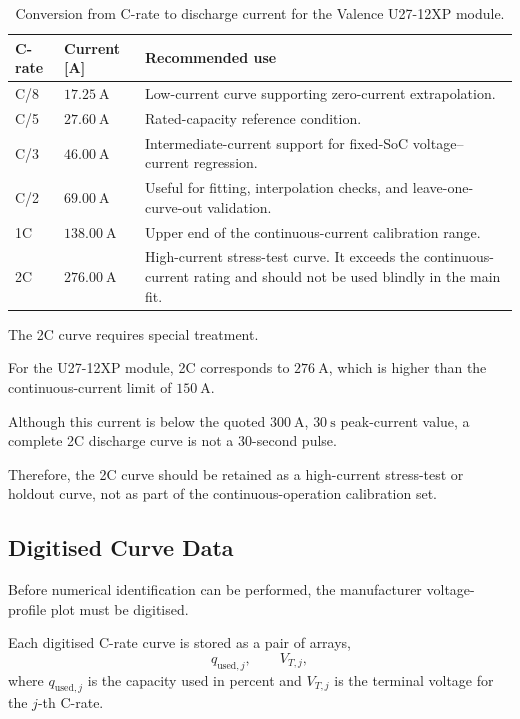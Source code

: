 \documentclass[a4paper,12pt]{article}
\begin{document}
\begin{table}[H]
\centering
\caption{Conversion from C-rate to discharge current for the Valence U27-12XP module.}
\label{tab:crate_currents}
\begin{tabularx}{0.99\textwidth}{@{}C{0.10\textwidth}C{0.20\textwidth}Y@{}}
\toprule
\textbf{C-rate} &
\textbf{Current [A]} &
\textbf{Recommended use} \\
\midrule
C/8 &
\(\SI{17.25}{\ampere}\) &
Low-current curve supporting zero-current extrapolation. \\
C/5 &
\(\SI{27.60}{\ampere}\) &
Rated-capacity reference condition. \\
C/3 &
\(\SI{46.00}{\ampere}\) &
Intermediate-current support for fixed-SoC voltage--current regression. \\
C/2 &
\(\SI{69.00}{\ampere}\) &
Useful for fitting, interpolation checks, and leave-one-curve-out validation. \\
1C &
\(\SI{138.00}{\ampere}\) &
Upper end of the continuous-current calibration range. \\
2C &
\(\SI{276.00}{\ampere}\) &
High-current stress-test curve.
It exceeds the continuous-current rating and should not be used blindly in the main fit. \\
\bottomrule
\end{tabularx}
\end{table}

The 2C curve requires special treatment.

For the U27-12XP module, 2C corresponds to \(\SI{276}{\ampere}\), which is higher than the continuous-current limit of \(\SI{150}{\ampere}\).

Although this current is below the quoted \(\SI{300}{\ampere}\), \(\SI{30}{\second}\) peak-current value, a complete 2C discharge curve is not a 30-second pulse.

Therefore, the 2C curve should be retained as a high-current stress-test or holdout curve, not as part of the continuous-operation calibration set.

\subsection{Digitised Curve Data}

Before numerical identification can be performed, the manufacturer voltage-profile plot must be digitised.

Each digitised C-rate curve is stored as a pair of arrays,
\[
q_{\mathrm{used},j},
\qquad
V_{T,j},
\]
where \(q_{\mathrm{used},j}\) is the capacity used in percent and \(V_{T,j}\) is the terminal voltage for the \(j\)-th C-rate.
\end{document}
